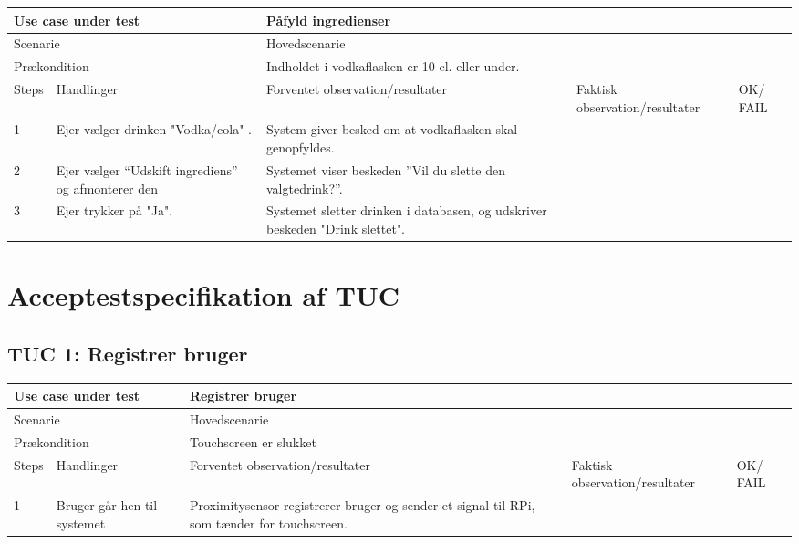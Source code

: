 \begin{table}[H]
\begin{tabular}{|p{1cm}|p{4cm}|p{4cm}|p{4cm}|p{1cm}|}
\hline
\multicolumn{2}{|p{5cm}|}{Use case under test} & \multicolumn{3}{p{9cm}|}{Påfyld ingredienser}                                       \\ \hline
\multicolumn{2}{|p{5cm}|}{Scenarie}            & \multicolumn{3}{p{9cm}|}{Hovedscenarie}                                          \\ \hline
\multicolumn{2}{|p{5cm}|}{Prækondition}        & \multicolumn{3}{p{9cm}|}{Indholdet i vodkaflasken er 10 cl. eller under.}                                 \\ \hline
Steps               & Handlinger          & Forventet observation/resultater & Faktisk observation/resultater & OK/ FAIL \\ \hline
1    & Ejer vælger drinken "Vodka/cola" .  & System giver besked om at vodkaflasken skal genopfyldes.&   &         \\ \hline
2    & Ejer vælger “Udskift ingrediens” og afmonterer den   & Systemet viser beskeden ”Vil du slette den valgtedrink?”.  &   &         \\ \hline
3    & Ejer trykker på "Ja".  & Systemet sletter drinken i databasen, og udskriver beskeden "Drink slettet".  &   &         \\ \hline

\end{tabular}
\end{table}


\section{Acceptestspecifikation af TUC}

\subsection{TUC 1: Registrer bruger}

\begin{table}[H]
\begin{tabular}{|p{1cm}|p{4cm}|p{4cm}|p{4cm}|p{1cm}|}
\hline
\multicolumn{2}{|p{5cm}|}{Use case under test} & \multicolumn{3}{p{9cm}|}{Registrer bruger}                                       \\ \hline
\multicolumn{2}{|p{5cm}|}{Scenarie}            & \multicolumn{3}{p{9cm}|}{Hovedscenarie}                                          \\ \hline
\multicolumn{2}{|p{5cm}|}{Prækondition}        & \multicolumn{3}{p{9cm}|}{Touchscreen er slukket}                                 \\ \hline
Steps               & Handlinger          & Forventet observation/resultater & Faktisk observation/resultater & OK/ FAIL \\ \hline
1    & Bruger går hen til systemet  & Proximitysensor registrerer bruger og sender et signal til RPi, som tænder for touchscreen.  &   &         \\ \hline

\end{tabular}
\end{table}

